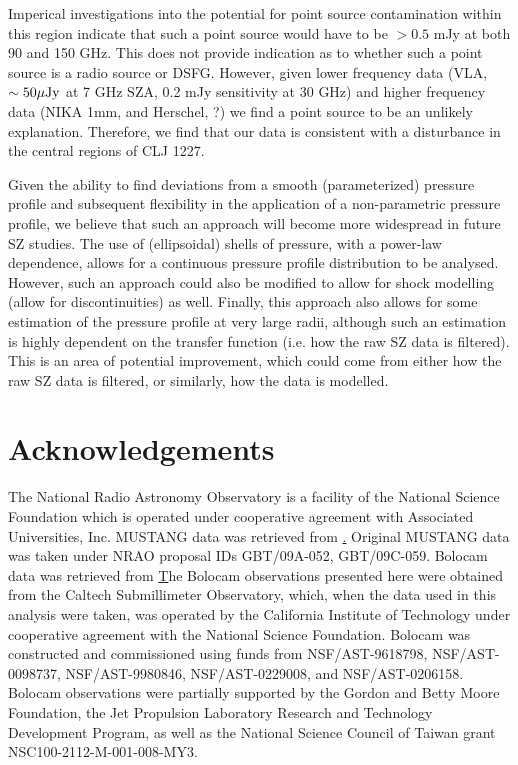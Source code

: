 \documentclass[iop,numberedappendix,apj]{emulateapj}
\begin{document}
Imperical investigations into the potential for point source contamination within this region
indicate that such a point source would have to be $> 0.5$ mJy at both 90 and 150 GHz. This does
not provide indication as to whether such a point source is a radio source or DSFG. However,
given lower frequency data (VLA, $\sim 50 {\rm \mu Jy}$ at 7 GHz
SZA, 0.2 mJy sensitivity at 30 GHz) and higher frequency data
(NIKA 1mm, and Herschel, ?) we find a point source to be an unlikely explanation. Therefore,
we find that our data is consistent with a disturbance in the central regions of CLJ 1227.

Given the ability to find deviations from a smooth (parameterized) pressure profile and
subsequent flexibility in the application of a non-parametric pressure profile, we believe that
such an approach will become more widespread in future SZ studies. The use of (ellipsoidal) shells
of pressure, with a power-law dependence, allows for a continuous pressure profile distribution
to be analysed. However, such an approach could also be modified to allow for shock modelling
(allow for discontinuities) as well. Finally, this approach also allows for some estimation of
the pressure profile at very large radii, although such an estimation is highly dependent on the
transfer function (i.e. how the raw SZ data is filtered). This is an area of potential improvement,
which could come from either how the raw SZ data is filtered, or similarly, how the data is modelled.

\section*{Acknowledgements}

The National Radio Astronomy Observatory is a facility of the National Science Foundation which is operated
under cooperative agreement with Associated Universities, Inc. MUSTANG data was retrieved from
\href{https://safe.nrao.edu/wiki/bin/view/GB/Pennarray/MUSTANG_CLASH}. Original MUSTANG data was
taken under NRAO proposal IDs GBT/09A-052, GBT/09C-059. Bolocam data was retrieved from
\href{http://irsa.ipac.caltech.edu/data/Planck/release\_2/ancillary-data/bolocam/}
The Bolocam observations presented here were obtained from the Caltech Submillimeter Observatory, which,
when the data used in this analysis were taken, was operated by the California Institute of Technology under
cooperative agreement with the National Science Foundation. Bolocam was constructed and commissioned using funds
from NSF/AST-9618798, NSF/AST-0098737, NSF/AST-9980846, NSF/AST-0229008, and NSF/AST-0206158. Bolocam observations
were partially supported by the Gordon and Betty Moore Foundation, the Jet Propulsion Laboratory Research and
Technology Development Program, as well as the National Science Council of Taiwan grant NSC100-2112-M-001-008-MY3.
\end{document}
